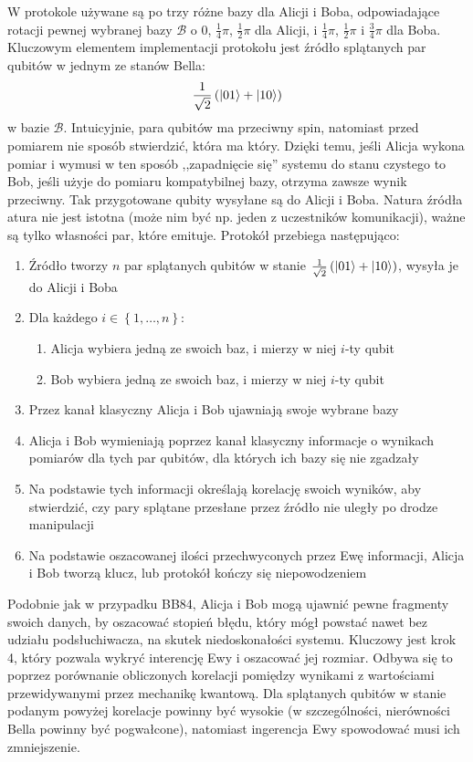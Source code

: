\documentclass[10pt]{article}
\begin{document}
W protokole używane są po trzy różne bazy dla Alicji i Boba, odpowiadające rotacji pewnej wybranej
bazy \(\mathcal{B}\) o \(0\), \(\frac{1}{4}\pi\), \(\frac{1}{2}\pi\) dla Alicji, i \(\frac{1}{4}\pi\), 
\(\frac{1}{2}\pi\) i \(\frac{3}{4}\pi\) dla Boba. Kluczowym elementem implementacji protokołu jest 
źródło splątanych par qubitów w jednym ze stanów Bella:
\[
\frac{1}{\sqrt{2}}\left(\Ket{01}+\Ket{10}\right)
\]
w bazie \(\mathcal{B}\). Intuicyjnie, para qubitów ma przeciwny spin, natomiast przed pomiarem nie 
sposób stwierdzić, która ma który. Dzięki temu, jeśli Alicja wykona pomiar i wymusi w ten sposób 
,,zapadnięcie się'' systemu do stanu czystego to Bob, jeśli użyje do pomiaru kompatybilnej bazy, otrzyma
zawsze wynik przeciwny. Tak przygotowane qubity wysyłane są do Alicji i Boba. Natura źródła atura nie 
jest  istotna (może nim być np. jeden z uczestników komunikacji), ważne są tylko własności par, które
emituje. Protokół przebiega następująco\cite{Ilic07}:

\begin{enumerate}
  \item Źródło tworzy \(n\) par splątanych qubitów w stanie \(\frac{1}{\sqrt{2}}\left(\Ket{01}+
    \Ket{10}\right)\), wysyła je do Alicji i Boba
  \item Dla każdego \(i\in\left\{1,\ldots,n\right\}\):
    \begin{enumerate}
      \item Alicja wybiera jedną ze swoich baz, i mierzy w niej \(i\)-ty qubit
      \item Bob wybiera jedną ze swoich baz, i mierzy w niej \(i\)-ty qubit
    \end{enumerate}
  \item Przez kanał klasyczny Alicja i Bob ujawniają swoje wybrane bazy
  \item Alicja i Bob wymieniają poprzez kanał klasyczny informacje o wynikach pomiarów dla tych
    par qubitów, dla których ich bazy się nie zgadzały
  \item Na podstawie tych informacji określają korelację swoich wyników, aby stwierdzić, czy pary
    splątane przesłane przez źródło nie uległy po drodze manipulacji
  \item Na podstawie oszacowanej ilości przechwyconych przez Ewę informacji, Alicja i Bob tworzą
    klucz, lub protokół kończy się niepowodzeniem 
\end{enumerate}

Podobnie jak w przypadku BB84, Alicja i Bob mogą ujawnić pewne fragmenty swoich danych, by oszacować
stopień błędu, który mógł powstać nawet bez udziału podsłuchiwacza, na skutek niedoskonałości systemu.
Kluczowy jest krok 4, który pozwala wykryć interencję Ewy i oszacować jej rozmiar. Odbywa się to
poprzez porównanie obliczonych korelacji pomiędzy wynikami z wartościami przewidywanymi przez mechanikę
kwantową. Dla splątanych qubitów w stanie podanym powyżej korelacje powinny być wysokie (w szczególności,
nierówności Bella powinny być pogwałcone), natomiast ingerencja Ewy spowodować musi ich zmniejszenie.
\end{document}
